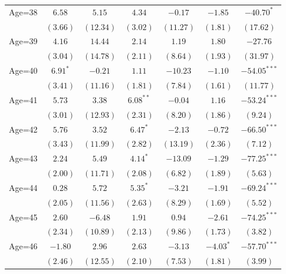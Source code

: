 \documentclass[fullpage]{paper}
\begin{document}
\begin{center}
\begin{longtable}{l c c c c c c }
Age=38      & $6.58$       & $5.15$       & $4.34$       & $-0.17$       & $-1.85$       & $-40.70^{*}$   \\
            & $(3.66)$     & $(12.34)$    & $(3.02)$     & $(11.27)$     & $(1.81)$      & $(17.62)$      \\
Age=39      & $4.16$       & $14.44$      & $2.14$       & $1.19$        & $1.80$        & $-27.76$       \\
            & $(3.04)$     & $(14.78)$    & $(2.11)$     & $(8.64)$      & $(1.93)$      & $(31.97)$      \\
Age=40      & $6.91^{*}$   & $-0.21$      & $1.11$       & $-10.23$      & $-1.10$       & $-54.05^{***}$ \\
            & $(3.41)$     & $(11.16)$    & $(1.81)$     & $(7.84)$      & $(1.61)$      & $(11.77)$      \\
Age=41      & $5.73$       & $3.38$       & $6.08^{**}$  & $-0.04$       & $1.16$        & $-53.24^{***}$ \\
            & $(3.01)$     & $(12.93)$    & $(2.31)$     & $(8.20)$      & $(1.86)$      & $(9.24)$       \\
Age=42      & $5.76$       & $3.52$       & $6.47^{*}$   & $-2.13$       & $-0.72$       & $-66.50^{***}$ \\
            & $(3.43)$     & $(11.99)$    & $(2.82)$     & $(13.19)$     & $(2.36)$      & $(7.12)$       \\
Age=43      & $2.24$       & $5.49$       & $4.14^{*}$   & $-13.09$      & $-1.29$       & $-77.25^{***}$ \\
            & $(2.00)$     & $(11.71)$    & $(2.08)$     & $(6.82)$      & $(1.89)$      & $(5.63)$       \\
Age=44      & $0.28$       & $5.72$       & $5.35^{*}$   & $-3.21$       & $-1.91$       & $-69.24^{***}$ \\
            & $(2.05)$     & $(11.56)$    & $(2.63)$     & $(8.29)$      & $(1.69)$      & $(5.52)$       \\
Age=45      & $2.60$       & $-6.48$      & $1.91$       & $0.94$        & $-2.61$       & $-74.25^{***}$ \\
            & $(2.34)$     & $(10.89)$    & $(2.13)$     & $(9.86)$      & $(1.73)$      & $(3.82)$       \\
Age=46      & $-1.80$      & $2.96$       & $2.63$       & $-3.13$       & $-4.03^{*}$   & $-57.70^{***}$ \\
            & $(2.46)$     & $(12.55)$    & $(2.10)$     & $(7.53)$      & $(1.81)$      & $(3.99)$       \\

\end{longtable}
\end{center}
\end{document}
